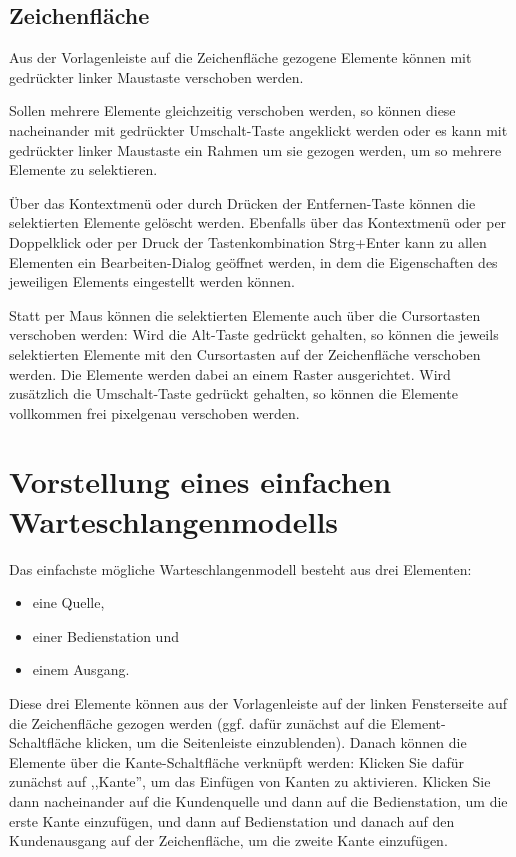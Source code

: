 \documentclass[deutsch]{svmono}
\begin{document}
\section{Zeichenfläche}

Aus der Vorlagenleiste auf die Zeichenfläche gezogene Elemente können mit gedrückter linker Maustaste verschoben werden.

Sollen mehrere Elemente gleichzeitig verschoben werden, so können diese nacheinander mit gedrückter Umschalt-Taste angeklickt werden oder es kann mit gedrückter linker Maustaste ein Rahmen um sie gezogen werden, um so mehrere Elemente zu selektieren.

Über das Kontextmenü oder durch Drücken der Entfernen-Taste können die selektierten Elemente gelöscht werden.
Ebenfalls über das Kontextmenü oder per Doppelklick oder per Druck der Tastenkombination Strg+Enter kann zu allen Elementen ein Bearbeiten-Dialog geöffnet werden, in dem die Eigenschaften des jeweiligen Elements eingestellt werden können.

Statt per Maus können die selektierten Elemente auch über die Cursortasten verschoben werden: Wird die Alt-Taste gedrückt gehalten, so können die jeweils selektierten Elemente mit den Cursortasten auf der Zeichenfläche verschoben werden. Die Elemente werden dabei an einem Raster ausgerichtet. Wird zusätzlich die Umschalt-Taste gedrückt gehalten, so können die Elemente vollkommen frei pixelgenau verschoben werden.



\chapter{Vorstellung eines einfachen Warteschlangenmodells}

Das einfachste mögliche Warteschlangenmodell besteht aus drei Elementen:

\begin{itemize}
\item
eine Quelle,
\item
einer Bedienstation und
\item
einem Ausgang.
\end{itemize}

Diese drei Elemente können aus der Vorlagenleiste auf der linken Fensterseite auf die Zeichenfläche gezogen werden (ggf. dafür zunächst auf die Element-Schaltfläche klicken, um die Seitenleiste einzublenden). Danach können die Elemente über die Kante-Schaltfläche verknüpft werden: Klicken Sie dafür zunächst auf ,,Kante'', um das Einfügen von Kanten zu aktivieren. Klicken Sie dann nacheinander auf die Kundenquelle und dann auf die Bedienstation, um die erste Kante einzufügen, und dann auf Bedienstation und danach auf den Kundenausgang auf der Zeichenfläche, um die zweite Kante einzufügen.
 
\end{document}
